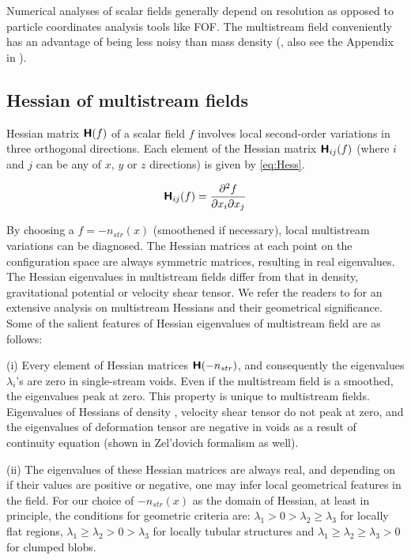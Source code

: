 \documentclass[fleqn,usenatbib,useAMS]{mnras}
\begin{document}
Numerical analyses of scalar fields generally depend on resolution as opposed to particle coordinates analysis tools like FOF. The multistream field conveniently has an advantage of being less noisy than mass density (\citealt{Shandarin2012}, also see the Appendix in \citealt{Ramachandra2017} ). 

\subsection{Hessian of multistream fields}


Hessian matrix $\textbf{\textsf{H}}(f)$ of a scalar field $f$ involves local second-order variations in three orthogonal directions. Each element of the Hessian matrix $\textbf{\textsf{H}}_{ij}(f)$ (where $i$ and $j$ can be any of $x$, $y$ or $z$ directions) is given by \autoref{eq:Hess}. 

\begin{equation}
\label{eq:Hess}
 \textbf{\textsf{H}}_{ij}(f) = \frac{\partial^2 f}{\partial x_i \partial x_j}
\end{equation}

By choosing a $f = -n_{str}(x)$ (smoothened if necessary), local multistream variations can be diagnosed. The Hessian matrices at each point on the configuration space are always symmetric matrices, resulting in real eigenvalues. The Hessian eigenvalues in multistream fields differ from that in density, gravitational potential or velocity shear tensor. We refer the readers to \cite{Ramachandra2017} for an extensive analysis on multistream Hessians and their geometrical significance. Some of the salient features of Hessian eigenvalues of multistream field are as follows: 

(i) Every element of Hessian matrices $\textbf{\textsf{H}}(-n_{str})$, and consequently the eigenvalues $\lambda_i$'s are zero in single-stream voids. Even if the multistream field is a smoothed, the eigenvalues peak at zero. This property is unique to multistream fields. Eigenvalues of Hessians of density \cite{Aragon-Calvo2007}, velocity shear tensor \cite{Libeskind2013} do not peak at zero, and the eigenvalues of deformation tensor are negative in voids as a result of continuity equation (shown in Zel’dovich formalism as well).

(ii) The eigenvalues of these Hessian matrices are always real, and depending on if their values are positive or negative, one may infer local geometrical features in the field. For our choice of $-n_{str}(x)$ as the domain of Hessian, at least in principle, the conditions for geometric criteria are: $\lambda_1 > 0 > \lambda_2 \geq \lambda_3$ for locally flat regions, $\lambda_1 \geq \lambda_2 > 0 > \lambda_3$ for locally tubular structures and $\lambda_1 \geq \lambda_2 \geq \lambda_3 > 0$ for clumped blobs. 
\end{document}
